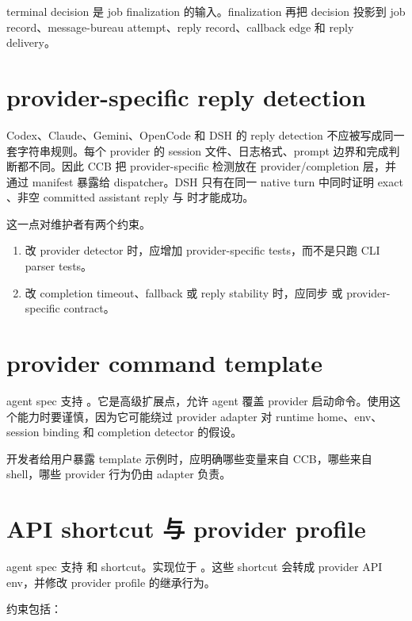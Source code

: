 terminal decision 是 job finalization 的输入。finalization 再把 decision 投影到 job record、message-bureau attempt、reply record、callback edge 和 reply delivery。

\section{provider-specific reply detection}

Codex、Claude、Gemini、OpenCode 和 DSH 的 reply detection 不应被写成同一套字符串规则。每个 provider 的 session 文件、日志格式、prompt 边界和完成判断都不同。因此 CCB 把 provider-specific 检测放在 provider/completion 层，并通过 manifest 暴露给 dispatcher。DSH 只有在同一 native turn 中同时证明 exact 、非空 committed assistant reply 与  时才能成功。

这一点对维护者有两个约束。

\begin{enumerate}
  \item 改 provider detector 时，应增加 provider-specific tests，而不是只跑 CLI parser tests。
  \item 改 completion timeout、fallback 或 reply stability 时，应同步  或 provider-specific contract。
\end{enumerate}

\section{provider command template}

agent spec 支持 。它是高级扩展点，允许 agent 覆盖 provider 启动命令。使用这个能力时要谨慎，因为它可能绕过 provider adapter 对 runtime home、env、session binding 和 completion detector 的假设。

开发者给用户暴露 template 示例时，应明确哪些变量来自 CCB，哪些来自 shell，哪些 provider 行为仍由 adapter 负责。

\section{API shortcut 与 provider profile}

agent spec 支持  和  shortcut。实现位于 。这些 shortcut 会转成 provider API env，并修改 provider profile 的继承行为。

约束包括：

